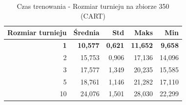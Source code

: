 \begin{table}[htbp]
\centering
\small
\setlength{\tabcolsep}{6pt}
\renewcommand{\arraystretch}{1.2}
\caption{Czas trenowania - Rozmiar turnieju na zbiorze 350 (CART)}
\label{tab:CART_tournament_size_350_time}
\begin{tabular}{r|r|r|r|r}
\toprule
Rozmiar turnieju & Średnia & Std & Maks & Min \\
\hline
\textbf{1} & \textbf{10,577} & \textbf{0,621} & \textbf{11,652} & \textbf{9,658} \\
2 & 15,753 & 0,906 & 17,136 & 14,096 \\
3 & 17,577 & 1,349 & 20,235 & 15,585 \\
5 & 18,761 & 1,146 & 21,282 & 17,110 \\
10 & 24,076 & 1,501 & 28,030 & 22,299 \\
\bottomrule
\end{tabular}
\end{table}